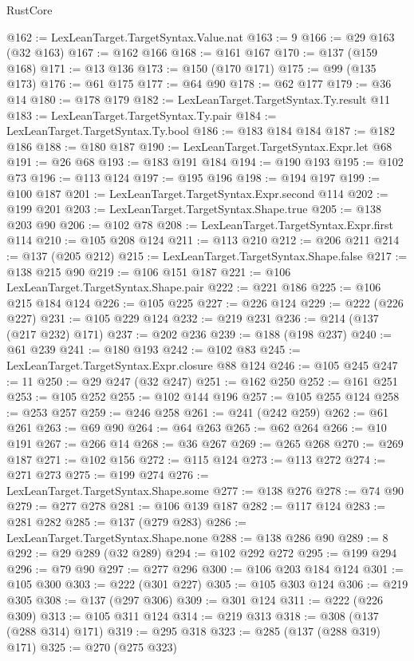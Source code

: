 \begin{lexlean}{RustCore}
\begin{coremodule}
@162 := LexLeanTarget.TargetSyntax.Value.nat
@163 := 9
@166 := @29 @163 (@32 @163)
@167 := @162 @166
@168 := @161 @167
@170 := @137 (@159 @168)
@171 := @13 @136
@173 := @150 (@170 @171)
@175 := @99 (@135 @173)
@176 := @61 @175
@177 := @64 @90
@178 := @62 @177
@179 := @36 @14
@180 := @178 @179
@182 := LexLeanTarget.TargetSyntax.Ty.result @11
@183 := LexLeanTarget.TargetSyntax.Ty.pair
@184 := LexLeanTarget.TargetSyntax.Ty.bool
@186 := @183 @184 @184
@187 := @182 @186
@188 := @180 @187
@190 := LexLeanTarget.TargetSyntax.Expr.let @68
@191 := @26 @68
@193 := @183 @191 @184
@194 := @190 @193
@195 := @102 @73
@196 := @113 @124
@197 := @195 @196
@198 := @194 @197
@199 := @100 @187
@201 := LexLeanTarget.TargetSyntax.Expr.second @114
@202 := @199 @201
@203 := LexLeanTarget.TargetSyntax.Shape.true
@205 := @138 @203 @90
@206 := @102 @78
@208 := LexLeanTarget.TargetSyntax.Expr.first @114
@210 := @105 @208 @124
@211 := @113 @210
@212 := @206 @211
@214 := @137 (@205 @212)
@215 := LexLeanTarget.TargetSyntax.Shape.false
@217 := @138 @215 @90
@219 := @106 @151 @187
@221 := @106 LexLeanTarget.TargetSyntax.Shape.pair
@222 := @221 @186
@225 := @106 @215 @184 @124
@226 := @105 @225
@227 := @226 @124
@229 := @222 (@226 @227)
@231 := @105 @229 @124
@232 := @219 @231
@236 := @214 (@137 (@217 @232) @171)
@237 := @202 @236
@239 := @188 (@198 @237)
@240 := @61 @239
@241 := @180 @193
@242 := @102 @83
@245 := LexLeanTarget.TargetSyntax.Expr.closure @88 @124
@246 := @105 @245
@247 := 11
@250 := @29 @247 (@32 @247)
@251 := @162 @250
@252 := @161 @251
@253 := @105 @252
@255 := @102 @144 @196
@257 := @105 @255 @124
@258 := @253 @257
@259 := @246 @258
@261 := @241 (@242 @259)
@262 := @61 @261
@263 := @69 @90
@264 := @64 @263
@265 := @62 @264
@266 := @10 @191
@267 := @266 @14
@268 := @36 @267
@269 := @265 @268
@270 := @269 @187
@271 := @102 @156
@272 := @115 @124
@273 := @113 @272
@274 := @271 @273
@275 := @199 @274
@276 := LexLeanTarget.TargetSyntax.Shape.some
@277 := @138 @276
@278 := @74 @90
@279 := @277 @278
@281 := @106 @139 @187
@282 := @117 @124
@283 := @281 @282
@285 := @137 (@279 @283)
@286 := LexLeanTarget.TargetSyntax.Shape.none
@288 := @138 @286 @90
@289 := 8
@292 := @29 @289 (@32 @289)
@294 := @102 @292 @272
@295 := @199 @294
@296 := @79 @90
@297 := @277 @296
@300 := @106 @203 @184 @124
@301 := @105 @300
@303 := @222 (@301 @227)
@305 := @105 @303 @124
@306 := @219 @305
@308 := @137 (@297 @306)
@309 := @301 @124
@311 := @222 (@226 @309)
@313 := @105 @311 @124
@314 := @219 @313
@318 := @308 (@137 (@288 @314) @171)
@319 := @295 @318
@323 := @285 (@137 (@288 @319) @171)
@325 := @270 (@275 @323)

\end{coremodule}
\end{lexlean}
